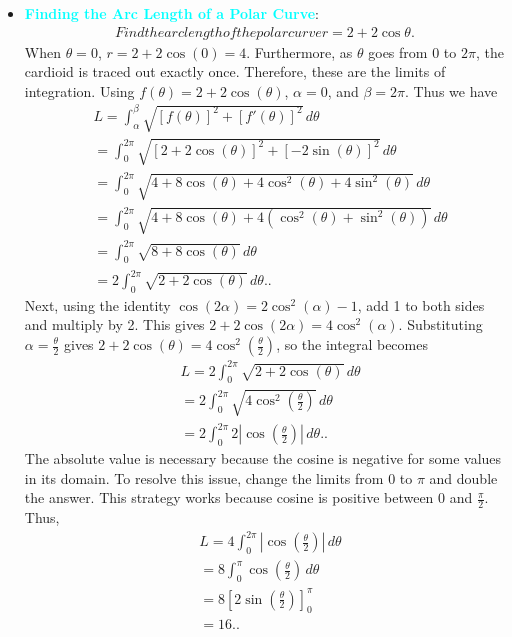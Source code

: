 \documentclass{report}
\begin{document}
\begin{itemize}
     \item \textbf{\textcolor{cyan}{Finding the Arc Length of a Polar Curve}}: 
         \begin{align*}
          Find the arc length of the polar curve 
              r = 2 + 2\cos{\theta }
          .\end{align*}
          \bigbreak \noindent 
               When \( \theta = 0 \), \( r = 2 + 2\cos(0) = 4 \). Furthermore, as \( \theta \) goes from \( 0 \) to \( 2\pi \), the cardioid is traced out exactly once. Therefore, these are the limits of integration. Using \( f(\theta) = 2 + 2\cos(\theta) \), \( \alpha = 0 \), and \( \beta = 2\pi \). Thus we have
     \begin{align*}
          &L = \int_{\alpha}^{\beta} \sqrt{[f(\theta)]^2 + [f'(\theta)]^2} \, d\theta  \\
          &= \int_{0}^{2\pi} \sqrt{[2 + 2\cos(\theta)]^2 + [-2\sin(\theta)]^2} \, d\theta  \\
          &= \int_{0}^{2\pi} \sqrt{4 + 8\cos(\theta) + 4\cos^2(\theta) + 4\sin^2(\theta)} \, d\theta  \\
          &= \int_{0}^{2\pi} \sqrt{4 + 8\cos(\theta) + 4(\cos^2(\theta) + \sin^2(\theta))} \, d\theta  \\
          &= \int_{0}^{2\pi} \sqrt{8 + 8\cos(\theta)} \, d\theta  \\
          &= 2 \int_{0}^{2\pi} \sqrt{2 + 2\cos(\theta)} \, d\theta.
     .\end{align*}
     Next, using the identity \( \cos(2\alpha) = 2\cos^2(\alpha) - 1 \), add 1 to both sides and multiply by 2. This gives \( 2 + 2\cos(2\alpha) = 4\cos^2(\alpha) \). Substituting \( \alpha = \frac{\theta}{2} \) gives \( 2 + 2\cos(\theta) = 4\cos^2\left(\frac{\theta}{2}\right) \), so the integral becomes
     \begin{align*}
          &L = 2 \int_{0}^{2\pi} \sqrt{2 + 2\cos(\theta)} \, d\theta  \\
          &= 2 \int_{0}^{2\pi} \sqrt{4\cos^2\left(\frac{\theta}{2}\right)} \, d\theta  \\
          &= 2 \int_{0}^{2\pi} 2 \left| \cos\left(\frac{\theta}{2}\right) \right| \, d\theta. 
     .\end{align*}
     The absolute value is necessary because the cosine is negative for some values in its domain. To resolve this issue, change the limits from \( 0 \) to \( \pi \) and double the answer. This strategy works because cosine is positive between \( 0 \) and \( \frac{\pi}{2} \). Thus,
     \begin{align*}
          &L = 4 \int_{0}^{2\pi} \left| \cos\left(\frac{\theta}{2}\right) \right| \, d\theta  \\
          &= 8 \int_{0}^{\pi} \cos\left(\frac{\theta}{2}\right) \, d\theta  \\
          &= 8 \left[ 2\sin\left(\frac{\theta}{2}\right) \right]_{0}^{\pi}  \\
          &= 16. 
     .\end{align*}


    \end{itemize}
\end{document}
